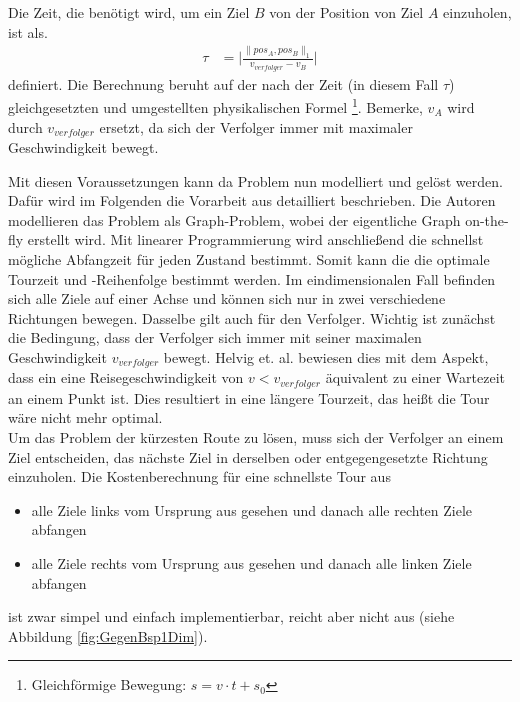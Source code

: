 \documentclass[german,version-2019-11]{uzl-thesis}
\begin{document}
\begin{definition}
\label{def:WegZeit}
Die Zeit, die benötigt wird, um ein Ziel $B$ von der Position von Ziel $A$ einzuholen, ist als. 
\begin{align*}
\tau &= \bigg\vert\frac{\|pos_A,pos_B\|_1}{v_{verfolger}-v_B}\bigg\vert
\end{align*} 
definiert.
Die Berechnung beruht auf der nach der Zeit (in diesem Fall $\tau$) gleichgesetzten und umgestellten physikalischen Formel \footnote{Gleichförmige Bewegung: $s=v\cdot t+s_0$}.
Bemerke, $v_A$ wird durch $v_{verfolger}$ ersetzt, da sich der Verfolger immer mit maximaler Geschwindigkeit bewegt.
\end{definition}\noindent
Mit diesen Voraussetzungen kann da Problem nun modelliert und gelöst werden. Dafür wird im Folgenden die Vorarbeit aus \cite{helvig} detailliert beschrieben. Die Autoren modellieren das Problem als Graph-Problem, wobei der eigentliche Graph on-the-fly erstellt wird. Mit linearer Programmierung wird anschließend die schnellst mögliche Abfangzeit für jeden Zustand bestimmt. Somit kann die die optimale Tourzeit und -Reihenfolge bestimmt werden.
Im eindimensionalen Fall befinden sich alle Ziele auf einer Achse und können sich nur in zwei verschiedene Richtungen bewegen. Dasselbe gilt auch für den Verfolger. Wichtig ist zunächst die Bedingung, dass der Verfolger sich immer mit seiner maximalen Geschwindigkeit $v_{verfolger}$ bewegt. Helvig et. al. bewiesen dies mit dem Aspekt, dass ein eine Reisegeschwindigkeit von $v<v_{verfolger}$ äquivalent zu einer Wartezeit an einem Punkt ist. Dies resultiert in eine längere Tourzeit, das heißt die Tour wäre nicht mehr optimal.\\
Um das Problem der kürzesten Route zu lösen, muss sich der Verfolger an einem Ziel entscheiden, das nächste Ziel in derselben oder entgegengesetzte Richtung einzuholen. Die Kostenberechnung für eine schnellste Tour aus
\begin{itemize}
\item alle Ziele links vom Ursprung aus gesehen und danach alle rechten Ziele abfangen
\item alle Ziele rechts vom Ursprung aus gesehen und danach alle linken Ziele abfangen
\end{itemize} 
ist zwar simpel und einfach implementierbar, reicht aber nicht aus (siehe Abbildung \ref{fig:GegenBsp1Dim}).
\end{document}
